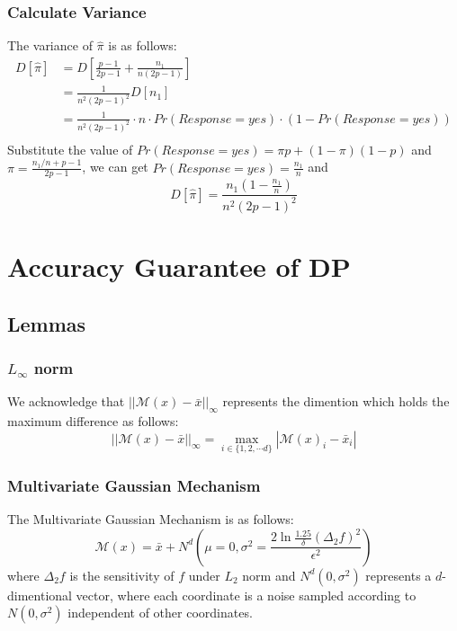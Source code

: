 \documentclass[a4paper,12pt]{article}
\begin{document}
\subsubsection{Calculate Variance}
The variance of $\hat{\pi}$ is as follows:
\begin{equation}
    \begin{aligned}
        D[\hat{\pi}] & = D[\frac{p - 1}{2p - 1} + \frac{n_1}{n(2p - 1)}]                                        \\
                     & = \frac{1}{n^2(2p - 1)^2} D[n_1]                                                         \\
                     & = \frac{1}{n^2(2p - 1)^2} \cdot n\cdot Pr(Response = yes) \cdot (1 - Pr(Response = yes)) \\
    \end{aligned}
\end{equation}
Substitute the value of $Pr(Response = yes) = \pi p + (1 - \pi)(1 - p)$ and $\pi = \frac{n_1/n + p - 1}{2p - 1} $, we can get $Pr(Response = yes) = \frac{n_1}{n}$ and
\begin{equation}
    D[\hat{\pi}] = \frac{n_1(1-\frac{n_1}{n})}{n^2(2p-1)^2}
\end{equation}

\section{Accuracy Guarantee of DP}
\subsection{Lemmas}
\subsubsection{$L_{\infty}$ norm}
We acknowledge that $||\mathcal{M}(x) - \bar{x}||_{\infty}$ represents the dimention which holds the maximum difference as follows:
\begin{equation}
    ||\mathcal{M}(x) - \bar{x}||_{\infty} = \max_{i\in \{1, 2, \cdots d\}}|\mathcal{M}(x)_i - \bar{x}_i|
\end{equation}

\subsubsection{Multivariate Gaussian Mechanism}
The Multivariate Gaussian Mechanism is as follows:
\begin{equation}
    \mathcal{M}(x) = \bar{x} + N^{d}(\mu = 0, \sigma^2 = \frac{2\ln{\frac{1.25}{\delta}}(\Delta_{2}f)^2}{\epsilon^2})
\end{equation}
where $\Delta_{2}f$ is the sensitivity of $f$ under $L_2$ norm and $N^{d}(0, \sigma^2)$ represents a $d$-dimentional vector, where each coordinate is a noise sampled according to $N(0, \sigma^2)$ independent of other coordinates.
\end{document}

